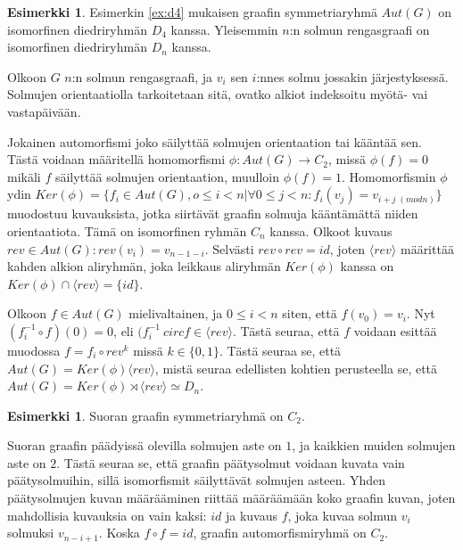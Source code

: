 \documentclass[a4paper, 12pt]{article}
\theoremstyle{definition}
\newtheorem{example}[mydef]{Esimerkki}
\theoremstyle{plain}
\begin{document}
\begin{example}
Esimerkin \ref{ex:d4} mukaisen graafin symmetriaryhmä $Aut(G)$ on isomorfinen diedriryhmän $D_4$ kanssa. Yleisemmin $n$:n solmun rengasgraafi on isomorfinen diedriryhmän $D_n$ kanssa.

Olkoon $G$ $n$:n solmun rengasgraafi, ja $v_i$ sen $i$:nnes solmu jossakin järjes\-tyk\-sessä. Solmujen orientaatiolla tarkoitetaan sitä, ovatko alkiot indeksoitu myötä- vai vastapäivään.

Jokainen automorfismi joko säilyttää solmujen orientaation tai kääntää sen. Tästä voidaan määritellä homomorfismi $\phi: Aut(G) \rightarrow C_2$, missä $\phi(f) = 0$ mikäli $f$ säilyttää solmujen orientaation, muulloin $\phi(f) = 1$. Homomorfismin $\phi$ ydin $Ker(\phi) = \{f_i \in Aut(G), o \leq i < n | \forall 0 \leq j < n: f_i(v_j) = v_{i + j\; (mod n)}\}$ muodostuu kuvauksista, jotka siirtävät graafin solmuja kään\-tämät\-tä niiden orientaatiota. Tämä on isomorfinen ryhmän $C_n$ kanssa. Olkoot kuvaus $rev \in Aut(G):  rev(v_i) = v_{n - 1 - i}$. Selvästi $rev \circ rev = id$, joten $\langle rev \rangle$ määrittää kahden alkion aliryhmän, joka leikkaus aliryhmän $Ker(\phi)$ kanssa on $Ker(\phi) \cap \langle rev \rangle = \{ id \}$.

Olkoon $f \in Aut(G)$ mielivaltainen, ja $0 \leq i < n$ siten, että $f(v_0) = v_i$. Nyt $(f_i^{-1} \circ f)(0) = 0$, eli $(f_i^{-1} \ circ f \in \langle rev \rangle$. Tästä seuraa, että $f$ voidaan esittää muodossa $f = f_i \circ rev^k$ missä $k \in \{0, 1\}$. Tästä seuraa se, että $Aut(G) = Ker(\phi) \langle rev \rangle$, mistä seuraa edellisten kohtien perusteella se, että $Aut(G) = Ker(\phi) \rtimes \langle rev \rangle \simeq D_n$.
\end{example}

\begin{example}
Suoran graafin symmetriaryhmä on $C_2$.

\begin{center}
\end{center}

Suoran graafin päädyissä olevilla solmujen aste on $1$, ja kaikkien muiden solmujen aste on $2$. Tästä seuraa se, että graafin päätysolmut voidaan kuvata vain päätysolmuihin, sillä isomorfismit säilyttävät solmujen asteen. Yhden päätysolmujen kuvan määrääminen riittää määräämään koko graafin kuvan, joten mahdollisia kuvauksia on vain kaksi: $id$ ja kuvaus $f$, joka kuvaa solmun $v_i$ solmuksi $v_{n - i + 1}$. Koska $f \circ f = id$, graafin automorfismiryhmä on $C_2$.
\end{example}
\end{document}
